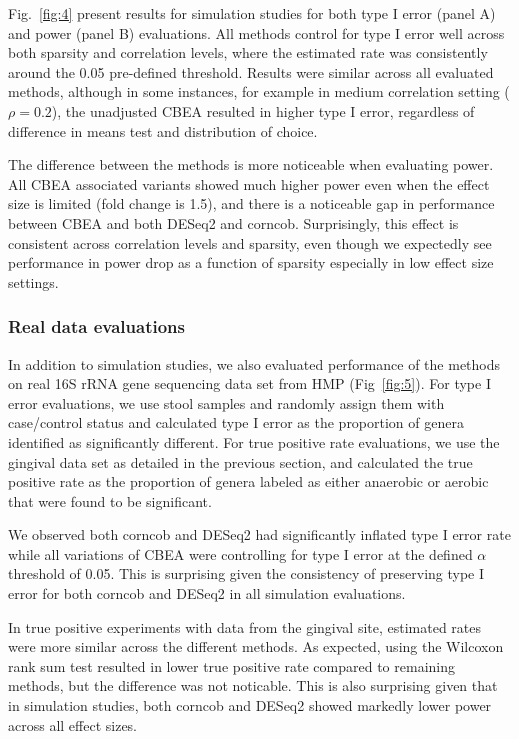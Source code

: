 Fig.~\ref{fig:4} present results for simulation studies for both type I error (panel A) and power (panel B) evaluations. All methods control for type I error well across both sparsity and correlation levels, where the estimated rate was consistently around the 0.05 pre-defined threshold. Results were similar across all evaluated methods, although in some instances, for example in medium correlation setting ($\rho = 0.2$), the unadjusted CBEA resulted in higher type I error, regardless of difference in means test and distribution of choice. 

The difference between the methods is more noticeable when evaluating power. All CBEA associated variants showed much higher power even when the effect size is limited (fold change is 1.5), and there is a noticeable gap in performance between CBEA and both DESeq2 and corncob. Surprisingly, this effect is consistent across correlation levels and sparsity, even though we expectedly see performance in power drop as a function of sparsity especially in low effect size settings.  

\subsubsection*{Real data evaluations}
In addition to simulation studies, we also evaluated performance of the methods on real 16S rRNA gene sequencing data set from HMP (Fig~\ref{fig:5}). For type I error evaluations, we use stool samples and randomly assign them with case/control status and calculated type I error as the proportion of genera identified as significantly different. For true positive rate evaluations, we use the gingival data set as detailed in the previous section, and calculated the true positive rate as the proportion of genera labeled as either anaerobic or aerobic that were found to be significant.   

We observed both corncob and DESeq2 had significantly inflated type I error rate while all variations of CBEA were controlling for type I error at the defined $\alpha$ threshold of 0.05. This is surprising given the consistency of preserving type I error for both corncob and DESeq2 in all simulation evaluations. 

In true positive experiments with data from the gingival site, estimated rates were more similar across the different methods. As expected, using the Wilcoxon rank sum test resulted in lower true positive rate compared to remaining methods, but the difference was not noticable. This is also surprising given that in simulation studies, both corncob and DESeq2 showed markedly lower power across all effect sizes.  

